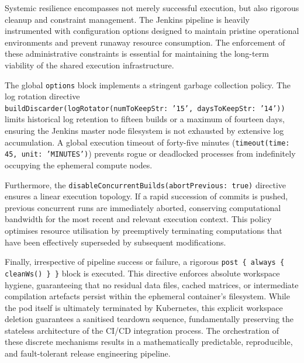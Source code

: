 Systemic resilience encompasses not merely successful execution, but also rigorous cleanup and constraint management. The Jenkins pipeline is heavily instrumented with configuration options designed to maintain pristine operational environments and prevent runaway resource consumption. The enforcement of these administrative constraints is essential for maintaining the long-term viability of the shared execution infrastructure.

The global \texttt{options} block implements a stringent garbage collection policy. The log rotation directive\\\texttt{buildDiscarder(logRotator(numToKeepStr: '15', daysToKeepStr: '14'))}\\limits historical log retention to fifteen builds or a maximum of fourteen days, ensuring the Jenkins master node filesystem is not exhausted by extensive log accumulation. A global execution timeout of forty-five minutes (\texttt{timeout(time: 45, unit: 'MINUTES')}) prevents rogue or deadlocked processes from indefinitely occupying the ephemeral compute nodes.

Furthermore, the \texttt{disableConcurrentBuilds(abortPrevious: true)} directive ensures a linear execution topology. If a rapid succession of commits is pushed, previous concurrent runs are immediately aborted, conserving computational bandwidth for the most recent and relevant execution context. This policy optimises resource utilisation by preemptively terminating computations that have been effectively superseded by subsequent modifications.

Finally, irrespective of pipeline success or failure, a rigorous \texttt{post \{ always \{ cleanWs() \} \}} block is executed. This directive enforces absolute workspace hygiene, guaranteeing that no residual data files, cached matrices, or intermediate compilation artefacts persist within the ephemeral container's filesystem. While the pod itself is ultimately terminated by Kubernetes, this explicit workspace deletion guarantees a sanitised teardown sequence, fundamentally preserving the stateless architecture of the CI/CD integration process. The orchestration of these discrete mechanisms results in a mathematically predictable, reproducible, and fault-tolerant release engineering pipeline.
